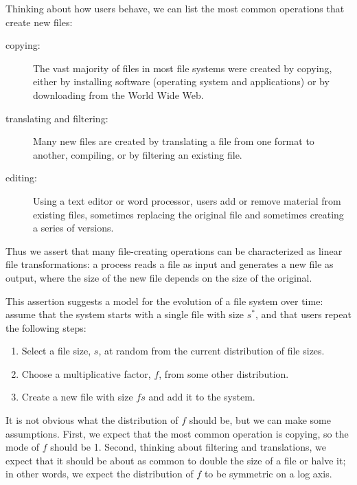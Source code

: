 \documentclass[10pt,twocolumn]{article}
\begin{document}
Thinking about how users behave, we can list the
most common operations that create new files:

\begin{description}

\item[copying:] The vast majority of files in most file
systems were created by copying, either by installing software
(operating system and applications) or by downloading from
the World Wide Web.

\item[translating and filtering:] Many new files are created by
translating a file from one format to another, compiling, or by
filtering an existing file.

\item[editing:] Using a text editor or word processor, users
add or remove material from existing files, sometimes replacing
the original file and sometimes creating a series of versions.

\end{description}

Thus we assert that
many file-creating operations can be characterized as linear file
transformations: a process reads a file as input and generates
a new file as output, where the size of the new file depends on
the size of the original.

This assertion suggests a model for the evolution
of a file system over time:  assume that the system starts with
a single file with size $s^*$, and that users repeat the
following steps:

\begin{enumerate}

\item Select a file size, $s$, at random from the current distribution of
file sizes.

\item Choose a multiplicative factor, $f$, from some other distribution.

\item Create a new file with size $f s$ and add it to the system.

\end{enumerate}

It is not obvious what the distribution of $f$ should be, but we can
make some assumptions.  First, we expect that the most common
operation is copying, so the mode of $f$ should be 1.  Second,
thinking about filtering and translations, we expect that it should be
about as common to double the size of a file or halve it; in other
words, we expect the distribution of $f$ to be symmetric on a log
axis.
\end{document}
